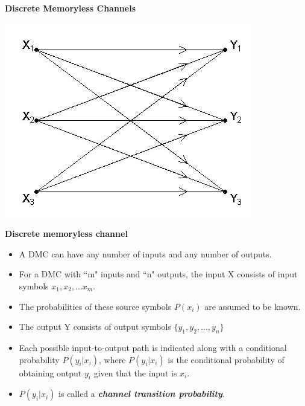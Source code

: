 \documentclass[a4]{beamer}
\begin{document}

{
\noindent \textbf{Discrete Memoryless Channels}

\begin{center}
\includegraphics[scale=0.54]{10Bnet}
\end{center}

}



\noindent \textbf{Discrete memoryless channel}
\begin{itemize}
\item A DMC can have any number of inputs and any number of outputs.
\item For a DMC with ``m" inputs and ``n" outputs, the input X consists of input symbols $x_1, x_2, \ldots x_m$.
\item The probabilities of these source symbols $P(x_i)$ are assumed to be known.
\item The output Y consists of output symbols $\{y_1,y_2,\ldots, y_n \}$
\item Each possible input-to-output path is indicated along with a conditional probability $P(y_i|x_i)$, where $P(y_i|x_i)$  is the conditional probability of
obtaining output $y_i$ given that the input is $x_i$. \item $P(y_i|x_i)$ is called a \textbf{\emph{channel transition probability}}.
\end{itemize}

\end{document}

